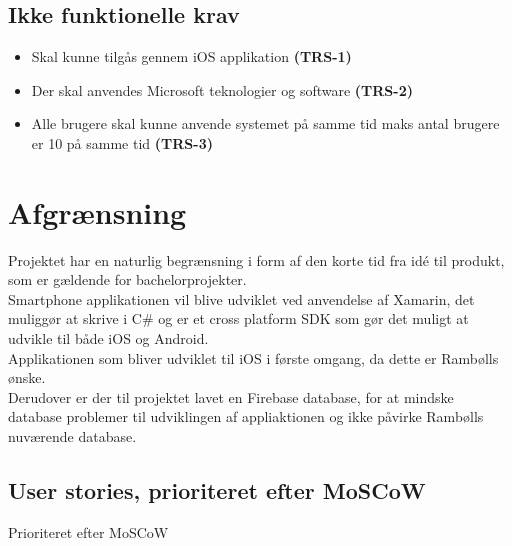\clearpage

\subsection{Ikke funktionelle krav}
\begin{itemize}[-]
	\itemsep 0.3em 
	\item Skal kunne tilgås gennem iOS applikation \textbf{(TRS-1)}
	\item Der skal anvendes Microsoft teknologier og software \textbf{(TRS-2)}
	\item Alle brugere skal kunne anvende systemet på samme tid maks antal brugere er 10 på samme tid \textbf{(TRS-3)}
\end{itemize}

\section{Afgrænsning}
Projektet har en naturlig begrænsning i form af den korte tid fra idé til produkt, som er gældende for bachelorprojekter.\\
Smartphone applikationen vil blive udviklet ved anvendelse af Xamarin, det muliggør at skrive i C\# og er et cross platform SDK som gør det muligt at udvikle til både iOS og Android. \\
Applikationen som bliver udviklet til iOS i første omgang, da dette er Rambølls ønske. \\
Derudover er der til projektet lavet en Firebase database, for at mindske database problemer til udviklingen af appliaktionen og ikke påvirke Rambølls nuværende database.

\subsection{User stories, prioriteret efter MoSCoW} \label{sec:MoSCoW}
Prioriteret efter MoSCoW

